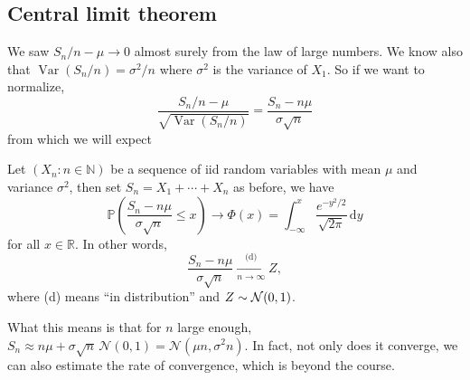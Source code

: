 \subsection{Central limit theorem}
We saw $S_n/n-\mu\to 0$ almost surely from the law of large numbers.
We know also that $\operatorname{Var}(S_n/n)=\sigma^2/n$ where $\sigma^2$ is the variance of $X_1$.
So if we want to normalize,
$$\frac{S_n/n-\mu}{\sqrt{\operatorname{Var}(S_n/n)}}=\frac{S_n-n\mu}{\sigma\sqrt{n}}$$
from which we will expect
\begin{theorem}
    Let $(X_n:n\in\mathbb N)$ be a sequence of iid random variables with mean $\mu$ and variance $\sigma^2$, then set $S_n=X_1+\cdots+X_n$ as before, we have
    $$\mathbb P\left( \frac{S_n-n\mu}{\sigma\sqrt{n}}\le x \right)\to\Phi(x)=\int_{-\infty}^x\frac{e^{-y^2/2}}{\sqrt{2\pi}}\,\mathrm dy$$
    for all $x\in\mathbb R$. In other words, 
    \[
        \frac{S_n-n\mu}{\sigma\sqrt{n}}\xrightarrow[n\to \infty]{\text{(d)}}Z,
    \]
    where (d) means ``in distribution'' and $ Z \sim {\mathcal{N}}(0,1) $.
\end{theorem}
\begin{note}
    What this means is that for $n$ large enough, $S_n\approx n\mu+\sigma\sqrt{n}\,\mathcal N(0,1)=\mathcal N(\mu n,\sigma^2n)$.
    In fact, not only does it converge, we can also estimate the rate of convergence, which is beyond the course.
\end{note}
